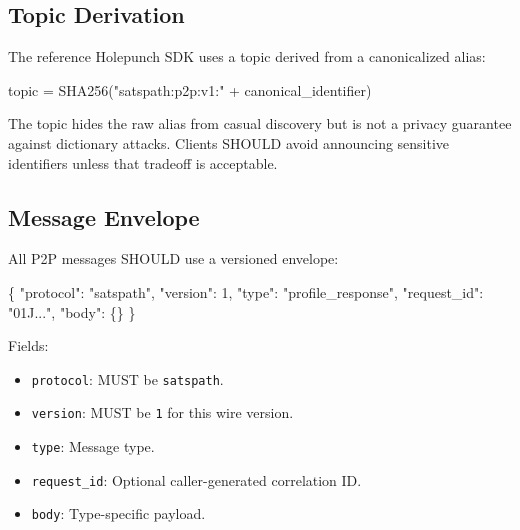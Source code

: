 \documentclass[
]{article}
\newenvironment{Shaded}{}{}
\newcommand{\DataTypeTok}[1]{\textcolor[rgb]{0.56,0.13,0.00}{#1}}
\newcommand{\DecValTok}[1]{\textcolor[rgb]{0.25,0.63,0.44}{#1}}
\newcommand{\FunctionTok}[1]{\textcolor[rgb]{0.02,0.16,0.49}{#1}}
\newcommand{\NormalTok}[1]{#1}
\newcommand{\StringTok}[1]{\textcolor[rgb]{0.25,0.44,0.63}{#1}}
\providecommand{\tightlist}{%
  \setlength{\itemsep}{0pt}\setlength{\parskip}{0pt}}
\begin{document}
\hypertarget{topic-derivation}{%
\subsection{Topic Derivation}\label{topic-derivation}}

The reference Holepunch SDK uses a topic derived from a canonicalized
alias:

\begin{Shaded}
\begin{Highlighting}[]
\NormalTok{topic = SHA256("satspath:p2p:v1:" + canonical\_identifier)}
\end{Highlighting}
\end{Shaded}

The topic hides the raw alias from casual discovery but is not a privacy
guarantee against dictionary attacks. Clients SHOULD avoid announcing
sensitive identifiers unless that tradeoff is acceptable.

\hypertarget{message-envelope}{%
\subsection{Message Envelope}\label{message-envelope}}

All P2P messages SHOULD use a versioned envelope:

\begin{Shaded}
\begin{Highlighting}[]
\FunctionTok{\{}
  \DataTypeTok{"protocol"}\FunctionTok{:} \StringTok{"satspath"}\FunctionTok{,}
  \DataTypeTok{"version"}\FunctionTok{:} \DecValTok{1}\FunctionTok{,}
  \DataTypeTok{"type"}\FunctionTok{:} \StringTok{"profile\_response"}\FunctionTok{,}
  \DataTypeTok{"request\_id"}\FunctionTok{:} \StringTok{"01J..."}\FunctionTok{,}
  \DataTypeTok{"body"}\FunctionTok{:} \FunctionTok{\{\}}
\FunctionTok{\}}
\end{Highlighting}
\end{Shaded}

Fields:

\begin{itemize}
\tightlist
\item
  \texttt{protocol}: MUST be \texttt{satspath}.
\item
  \texttt{version}: MUST be \texttt{1} for this wire version.
\item
  \texttt{type}: Message type.
\item
  \texttt{request\_id}: Optional caller-generated correlation ID.
\item
  \texttt{body}: Type-specific payload.
\end{itemize}
\end{document}
